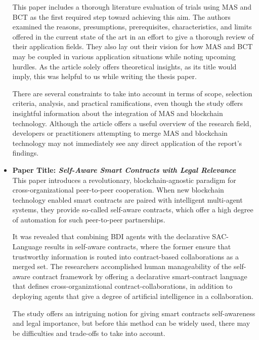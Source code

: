\begin{itemize}[label={}]
\vspace{.5cm}

This paper\cite{literature} includes a thorough literature evaluation of trials using \ac{MAS} and \ac{BCT} as the first required step toward achieving this aim. The authors examined the reasons, presumptions, prerequisites, characteristics, and limits offered in the current state of the art in an effort to give a thorough review of their application fields. They also lay out their vision for how \ac{MAS} and \ac{BCT} may be coupled in various application situations while noting upcoming hurdles. As the article solely offers theoretical insights, as its title would imply, this was helpful to us while writing the thesis paper.

\vspace{.5cm}

There are several constraints to take into account in terms of scope, selection criteria, analysis, and practical ramifications, even though the study offers insightful information about the integration of \ac{MAS} and blockchain technology. Although the article offers a useful overview of the research field, developers or practitioners attempting to merge MAS and blockchain technology may not immediately see any direct application of the report's findings.

\vspace{.5cm}

\item \textbf{Paper Title: \textit{Self-Aware Smart Contracts with Legal Relevance}} \\

This paper \cite{sac} introduces a revolutionary, blockchain-agnostic paradigm for cross-organizational peer-to-peer cooperation. When new blockchain technology enabled smart contracts are paired with intelligent multi-agent systems, they provide so-called self-aware contracts, which offer a high degree of automation for such peer-to-peer partnerships.

\vspace{.5cm}

It was revealed that combining \ac{BDI} agents with the declarative SAC-Language results in self-aware contracts, where the former ensure that trustworthy information is routed into contract-based collaborations as a merged set. The researchers accomplished human manageability of the self-aware contract framework by offering a declarative smart-contract language that defines cross-organizational contract-collaborations, in addition to deploying agents that give a degree of artificial intelligence in a collaboration.

\vspace{.5cm}

The study offers an intriguing notion for giving smart contracts self-awareness and legal importance, but before this method can be widely used, there may be difficulties and trade-offs to take into account.
\end{itemize}

